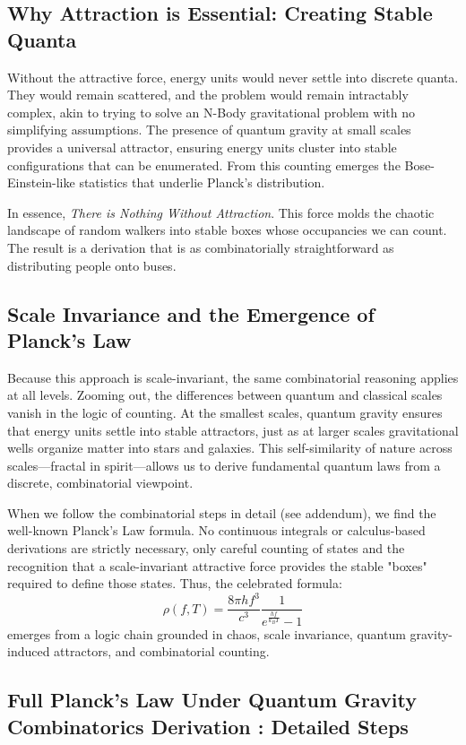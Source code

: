 \documentclass{report}
\begin{document}
\subsection*{Why Attraction is Essential: Creating Stable Quanta}

Without the attractive force, energy units would never settle into discrete quanta. They would remain scattered, and the problem would remain intractably complex, akin to trying to solve an N-Body gravitational problem with no simplifying assumptions. The presence of quantum gravity at small scales provides a universal attractor, ensuring energy units cluster into stable configurations that can be enumerated. From this counting emerges the Bose-Einstein-like statistics that underlie Planck’s distribution.

In essence, \emph{There is Nothing Without Attraction}. This force molds the chaotic landscape of random walkers into stable boxes whose occupancies we can count. The result is a derivation that is as combinatorially straightforward as distributing people onto buses.

\subsection*{Scale Invariance and the Emergence of Planck’s Law}

Because this approach is scale-invariant, the same combinatorial reasoning applies at all levels. Zooming out, the differences between quantum and classical scales vanish in the logic of counting. At the smallest scales, quantum gravity ensures that energy units settle into stable attractors, just as at larger scales gravitational wells organize matter into stars and galaxies. This self-similarity of nature across scales—fractal in spirit—allows us to derive fundamental quantum laws from a discrete, combinatorial viewpoint.

When we follow the combinatorial steps in detail (see addendum), we find the well-known Planck’s Law formula. No continuous integrals or calculus-based derivations are strictly necessary, only careful counting of states and the recognition that a scale-invariant attractive force provides the stable "boxes" required to define those states. Thus, the celebrated formula:
\[
\rho(f,T) = \frac{8 \pi h f^3}{c^3} \frac{1}{e^{\frac{hf}{k_B T}} - 1}
\]
emerges from a logic chain grounded in chaos, scale invariance, quantum gravity-induced attractors, and combinatorial counting.

\subsection*{Full Planck's Law Under Quantum Gravity Combinatorics Derivation : Detailed Steps}
\end{document}
